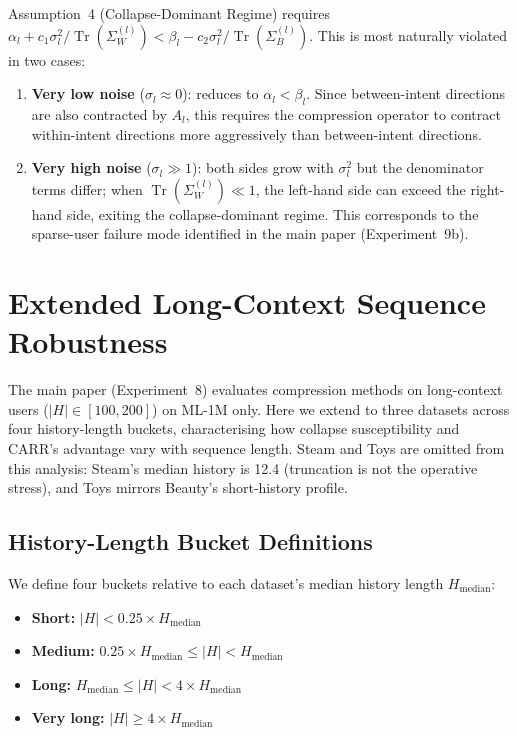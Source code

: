 \documentclass[letterpaper,10pt]{article}
\newcommand{\tr}{\operatorname{Tr}}
\begin{document}
Assumption~4 (Collapse-Dominant Regime) requires $\alpha_l + c_1\sigma_l^2 / \tr(\Sigma_W^{(l)}) < \beta_l - c_2\sigma_l^2 / \tr(\Sigma_B^{(l)})$. This is most naturally violated in two cases:
\begin{enumerate}
  \item \textbf{Very low noise} ($\sigma_l \approx 0$): reduces to $\alpha_l < \beta_l$. Since between-intent directions are also contracted by $A_l$, this requires the compression operator to contract within-intent directions more aggressively than between-intent directions.
  \item \textbf{Very high noise} ($\sigma_l \gg 1$): both sides grow with $\sigma_l^2$ but the denominator terms differ; when $\tr(\Sigma_W^{(l)}) \ll 1$, the left-hand side can exceed the right-hand side, exiting the collapse-dominant regime. This corresponds to the sparse-user failure mode identified in the main paper (Experiment~9b).
\end{enumerate}

\section{Extended Long-Context Sequence Robustness}
\label{sec:supp-longcontext}

The main paper (Experiment~8) evaluates compression methods on long-context users ($|H| \in [100, 200]$) on ML-1M only. Here we extend to three datasets across four history-length buckets, characterising how collapse susceptibility and CARR's advantage vary with sequence length. Steam and Toys are omitted from this analysis: Steam's median history is 12.4 (truncation is not the operative stress), and Toys mirrors Beauty's short-history profile.

\subsection{History-Length Bucket Definitions}

We define four buckets relative to each dataset's median history length $H_{\mathrm{median}}$:
\begin{itemize}
  \item \textbf{Short:} $|H| < 0.25 \times H_{\mathrm{median}}$
  \item \textbf{Medium:} $0.25 \times H_{\mathrm{median}} \le |H| < H_{\mathrm{median}}$
  \item \textbf{Long:} $H_{\mathrm{median}} \le |H| < 4 \times H_{\mathrm{median}}$
  \item \textbf{Very long:} $|H| \ge 4 \times H_{\mathrm{median}}$
\end{itemize}
\end{document}
